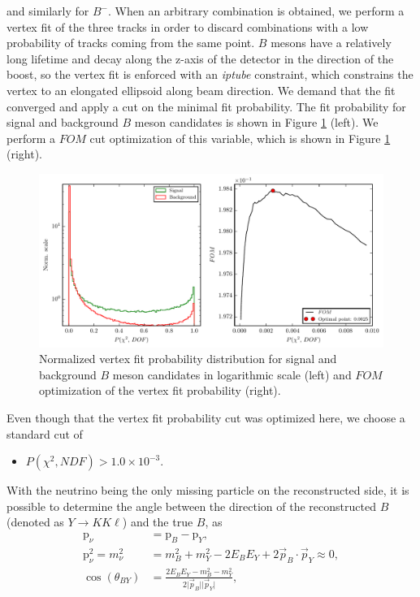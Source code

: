 \documentclass[oneside,a4paper,openany,12pt]{scrbook}
\begin{document}
and similarly for $B^-$. When an arbitrary combination is obtained, we perform a vertex fit of the three tracks in order to discard combinations with a low probability of tracks coming from the same point. $B$ mesons have a relatively long lifetime and decay along the z-axis of the detector in the direction of the boost, so the vertex fit is enforced with an \textit{iptube} constraint, which constrains the vertex to an elongated ellipsoid along beam direction. We demand that the fit converged and apply a cut on the minimal fit probability. The fit probability for signal and background $B$ meson candidates is shown in Figure \ref{fig:vtx} (left). We perform a $FOM$ cut optimization of this variable, which is shown in Figure \ref{fig:vtx} (right).

\begin{figure}[H]
\centering
\captionsetup{width=0.8\linewidth}
\includegraphics[width=\linewidth]{fig/VTX}
\caption{Normalized vertex fit probability distribution for signal and background $B$ meson candidates in logarithmic scale (left) and $FOM$ optimization of the vertex fit probability (right).}
\label{fig:vtx}
\end{figure}

Even though that the vertex fit probability cut was optimized here, we choose a standard cut of
\begin{itemize}
\item $P(\chi^2,NDF) > 1.0\times 10^{-3}$.
\end{itemize}

With the neutrino being the only missing particle on the reconstructed side, it is possible to determine the angle between the direction of the reconstructed $B$ (denoted as $Y \to K K \ell$) and the true $B$, as
\begin{align}
\mathrm{p}_\nu &= \mathrm{p}_B - \mathrm{p}_{Y}, \\
\label{eq:massnu}
\mathrm{p}_\nu^2 = m_\nu^2 &= m_B^2 + m_Y^2 - 2E_BE_Y + 2\vec{p}_B \cdot \vec{p}_Y \approx 0, \\ 
\label{eq:cosby}
\cos \left(\theta_{BY}\right) &= \frac{2E_BE_Y - m_B^2 - m_Y^2}{2\vert \vec{p}_B \vert \vert \vec{p}_Y\vert},
\end{align} 
\end{document}
